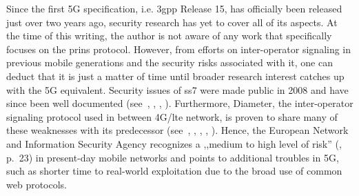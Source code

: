 Since the first 5G specification, i.e. \gls{3gpp} Release 15, has officially been released just over two years ago, security research has yet to cover all of its aspects.
At the time of this writing, the author is not aware of any work that specifically focuses on the \gls{prins} protocol.
However, from efforts on inter-operator signaling in previous mobile generations and the security risks associated with it, one can deduct that it is just a matter of time until broader research interest catches up with the 5G equivalent.
Security issues of \gls{ss7} were made public in 2008 and have since been well documented (see~\cite{engel2008locating}, \cite{engel2014locate}, \cite{oliveira2014world}, \cite{puzankov2014how}).
Furthermore, Diameter, the inter-operator signaling protocol used in between 4G/\gls{lte} network, is proven to share many of these weaknesses with its predecessor (see~\cite{rao2015unblock}, \cite{rao2016privacy}, \cite{rao2016where}, \cite{holtmanns2016user}, \cite{holtmanns2017sms}).
Hence, the European Network and Information Security Agency recognizes a ,,medium to high level of risk'' (\cite{enisa2018signal}, p.~23) in present-day mobile networks and points to additional troubles in 5G, such as shorter time to real-world exploitation due to the broad use of common web protocols.
